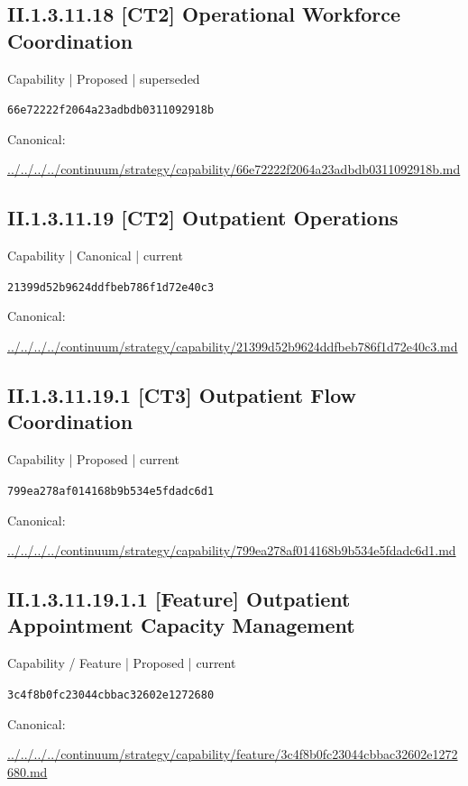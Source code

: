 \documentclass[10pt,a4paper]{article}
\begin{document}
\subsection*{II.1.3.11.18 [CT2] Operational Workforce Coordination}
{\small Capability | Proposed | superseded}\par
\texttt{66e72222f2064a23adbdb0311092918b}\par
Canonical: \par
{\footnotesize\url{../../../../continuum/strategy/capability/66e72222f2064a23adbdb0311092918b.md}}\par
\subsection*{II.1.3.11.19 [CT2] Outpatient Operations}
{\small Capability | Canonical | current}\par
\texttt{21399d52b9624ddfbeb786f1d72e40c3}\par
Canonical: \par
{\footnotesize\url{../../../../continuum/strategy/capability/21399d52b9624ddfbeb786f1d72e40c3.md}}\par
\subsection*{II.1.3.11.19.1 [CT3] Outpatient Flow Coordination}
{\small Capability | Proposed | current}\par
\texttt{799ea278af014168b9b534e5fdadc6d1}\par
Canonical: \par
{\footnotesize\url{../../../../continuum/strategy/capability/799ea278af014168b9b534e5fdadc6d1.md}}\par
\subsection*{II.1.3.11.19.1.1 [Feature] Outpatient Appointment Capacity Management}
{\small Capability / Feature | Proposed | current}\par
\texttt{3c4f8b0fc23044cbbac32602e1272680}\par
Canonical: \par
{\footnotesize\url{../../../../continuum/strategy/capability/feature/3c4f8b0fc23044cbbac32602e1272680.md}}\par
\end{document}
